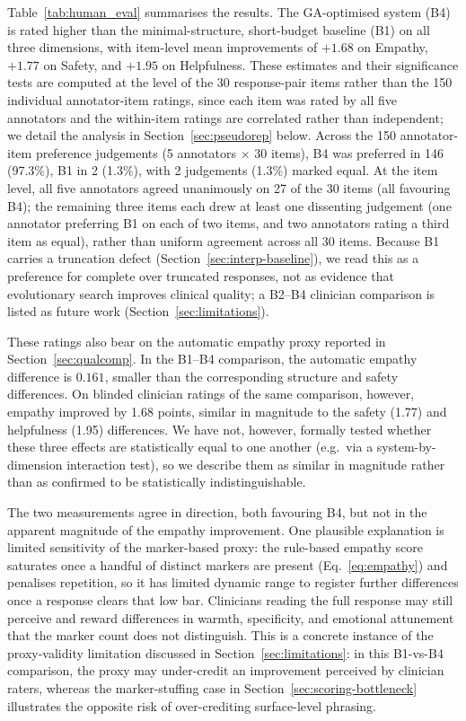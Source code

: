 \documentclass[mathematics,article,submit,xetex,moreauthors]{Definitions/mdpi}
\begin{document}
Table~\ref{tab:human_eval} summarises the results. The GA-optimised
system (B4) is rated higher than the minimal-structure, short-budget baseline (B1) on
all three dimensions, with item-level mean improvements of $+1.68$ on
Empathy, $+1.77$ on Safety, and $+1.95$ on Helpfulness. These estimates
and their significance tests are computed at the level of the 30
response-pair items rather than the 150 individual annotator-item
ratings, since each item was rated by all five annotators and the
within-item ratings are correlated rather than independent; we detail
the analysis in Section~\ref{sec:pseudorep} below. Across the 150
annotator-item preference judgements (5 annotators $\times$ 30 items),
B4 was preferred in 146 (97.3\%), B1 in 2 (1.3\%), with 2 judgements
(1.3\%) marked equal. At the item level, all five annotators agreed
unanimously on 27 of the 30 items (all favouring B4); the remaining
three items each drew at least one dissenting judgement (one annotator
preferring B1 on each of two items, and two annotators rating a third
item as equal), rather than uniform agreement across all 30 items. Because B1 carries a
truncation defect (Section~\ref{sec:interp-baseline}), we read this as a
preference for complete over truncated responses, not as evidence that
evolutionary search improves clinical quality; a B2--B4 clinician comparison
is listed as future work (Section~\ref{sec:limitations}).

These ratings also bear on the automatic empathy proxy reported in
Section~\ref{sec:qualcomp}. In the B1--B4 comparison, the automatic empathy
difference is $0.161$, smaller than the corresponding structure and safety
differences. On blinded clinician ratings of the same comparison, however,
empathy improved by 1.68 points, similar in magnitude to the safety (1.77) and
helpfulness (1.95) differences. We have not,
however, formally tested whether these three effects are statistically equal
to one another (e.g.\ via a system-by-dimension interaction test), so we
describe them as similar in magnitude rather than as confirmed to be
statistically indistinguishable.

The two measurements agree in direction, both favouring B4, but not in the
apparent magnitude of the empathy improvement. One plausible explanation is
limited sensitivity of the marker-based proxy: the rule-based empathy score
saturates once a handful of distinct markers are present
(Eq.~\eqref{eq:empathy}) and penalises repetition, so it has limited dynamic
range to register further differences once a response clears that low bar.
Clinicians reading the full response may still perceive and reward differences
in warmth, specificity, and emotional attunement that the marker count does
not distinguish. This is a concrete instance of the proxy-validity limitation
discussed in Section~\ref{sec:limitations}: in this B1-vs-B4 comparison, the
proxy may under-credit an improvement perceived by clinician raters, whereas
the marker-stuffing case in Section~\ref{sec:scoring-bottleneck} illustrates
the opposite risk of over-crediting surface-level phrasing. 
\end{document}
